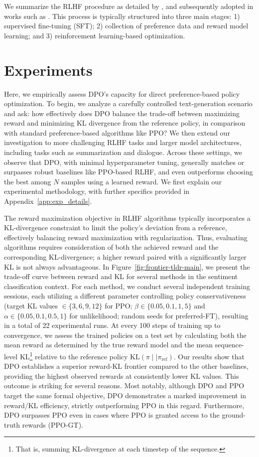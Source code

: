We summarize the RLHF procedure as detailed by \citeauthor{ziegler2020finetuning}, and subsequently adopted in works such as \citep{stiennon2022learning, bai2022training, ouyang2022training}. This process is typically structured into three main stages: 1) supervised fine-tuning (SFT); 2) collection of preference data and reward model learning; and 3) reinforcement learning-based optimization.

\section{Experiments}
Here, we empirically assess DPO’s capacity for direct preference-based policy optimization. To begin, we analyze a carefully controlled text-generation scenario and ask: how effectively does DPO balance the trade-off between maximizing reward and minimizing KL divergence from the reference policy, in comparison with standard preference-based algorithms like PPO? We then extend our investigation to more challenging RLHF tasks and larger model architectures, including tasks such as summarization and dialogue. Across these settings, we observe that DPO, with minimal hyperparameter tuning, generally matches or surpasses robust baselines like PPO-based RLHF, and even outperforms choosing the best among $N$ samples using a learned reward. We first explain our experimental methodology, with further specifics provided in Appendix~\ref{app:exp_details}.

The reward maximization objective in RLHF algorithms typically incorporates a KL-divergence constraint to limit the policy's deviation from a reference, effectively balancing reward maximization with regularization. Thus, evaluating algorithms requires consideration of both the achieved reward and the corresponding KL-divergence; a higher reward paired with a significantly larger KL is not always advantageous. In Figure~\ref{fig:frontier-tldr-main}, we present the trade-off curve between reward and KL for several methods in the sentiment classification context. For each method, we conduct several independent training sessions, each utilizing a different parameter controlling policy conservativeness (target KL values $\in\{3,6,9,12\}$ for PPO; $\beta \in \{0.05,0.1,1,5\}$ and $\alpha\in\{0.05,0.1,0.5,1\}$ for unlikelihood; random seeds for preferred-FT), resulting in a total of 22 experimental runs. At every 100 steps of training up to convergence, we assess the trained policies on a test set by calculating both the mean reward as determined by the true reward model and the mean sequence-level KL\footnote{That is, summing KL-divergence at each timestep of the sequence.} relative to the reference policy $\text{KL}\left(\pi\mid \mid \pi_\text{ref}\right)$. Our results show that DPO establishes a superior reward-KL frontier compared to the other baselines, providing the highest observed rewards at consistently lower KL values. This outcome is striking for several reasons. Most notably, although DPO and PPO target the same formal objective, DPO demonstrates a marked improvement in reward/KL efficiency, strictly outperforming PPO in this regard. Furthermore, DPO surpasses PPO even in cases where PPO is granted access to the ground-truth rewards (PPO-GT).

